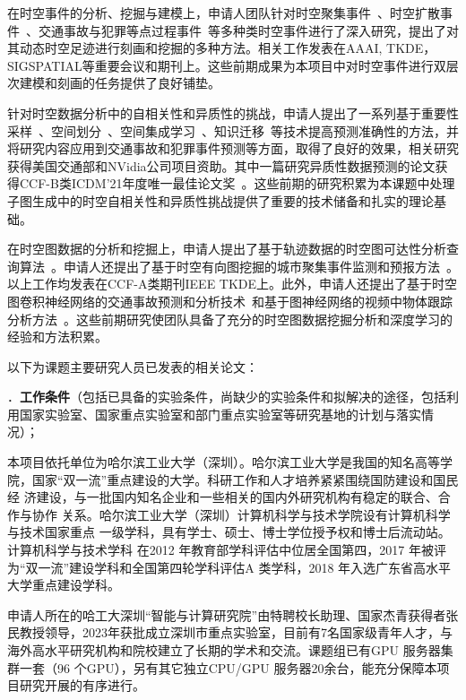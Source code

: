 在时空事件的分析、挖掘与建模上，申请人团队针对时空聚集事件~\cite{}、时空扩散事件~\cite{}、交通事故与犯罪等点过程事件~\cite{}等多种类时空事件进行了深入研究，提出了对其动态时空足迹进行刻画和挖掘的多种方法。相关工作发表在AAAI, TKDE，SIGSPATIAL等重要会议和期刊上。这些前期成果为本项目中对时空事件进行双层次建模和刻画的任务提供了良好铺垫。

针对时空数据分析中的自相关性和异质性的挑战，申请人提出了一系列基于重要性采样~\cite{}、空间划分~\cite{}、空间集成学习~\cite{}、知识迁移~\cite{}等技术提高预测准确性的方法，并将研究内容应用到交通事故和犯罪事件预测等方面，取得了良好的效果，相关研究获得美国交通部和NVidia公司项目资助。其中一篇研究异质性数据预测的论文获得CCF-B类ICDM'21年度唯一最佳论文奖~\cite{}。这些前期的研究积累为本课题中处理子图生成中的时空自相关性和异质性挑战提供了重要的技术储备和扎实的理论基础。

在时空图数据的分析和挖掘上，申请人提出了基于轨迹数据的时空图可达性分析查询算法~\cite{}。申请人还提出了基于时空有向图挖掘的城市聚集事件监测和预报方法~\cite{}。以上工作均发表在CCF-A类期刊IEEE TKDE上。此外，申请人还提出了基于时空图卷积神经网络的交通事故预测和分析技术~\cite{}和基于图神经网络的视频中物体跟踪分析方法~\cite{}。这些前期研究使团队具备了充分的时空图数据挖掘分析和深度学习的经验和方法积累。

以下为课题主要研究人员已发表的相关论文：



{\sihao \color{MsBlue} ．{\bfseries 工作条件}（包括已具备的实验条件，尚缺少的实验条件和拟解决的途径，包括利用国家实验室、国家重点实验室和部门重点实验室等研究基地的计划与落实情况）；}

本项目依托单位为哈尔滨工业大学（深圳）。哈尔滨工业大学是我国的知名高等学
院，国家“双一流”重点建设的大学。科研工作和人才培养紧紧围绕国防建设和国民经
济建设，与一批国内知名企业和一些相关的国内外研究机构有稳定的联合、合作与协作
关系。哈尔滨工业大学（深圳）计算机科学与技术学院设有计算机科学与技术国家重点
一级学科，具有学士、硕士、博士学位授予权和博士后流动站。计算机科学与技术学科
在2012 年教育部学科评估中位居全国第四，2017 年被评为“双一流”建设学科和全国第四轮学科评估A 类学科，2018 年入选广东省高水平大学重点建设学科。

申请人所在的哈工大深圳“智能与计算研究院”由特聘校长助理、国家杰青获得者张民教授领导，2023年获批成立深圳市重点实验室，目前有7名国家级青年人才，与海外高水平研究机构和院校建立了长期的学术和交流。课题组已有GPU 服务器集群一套（96 个GPU），另有其它独立CPU/GPU 服务器20余台，能充分保障本项目研究开展的有序进行。


